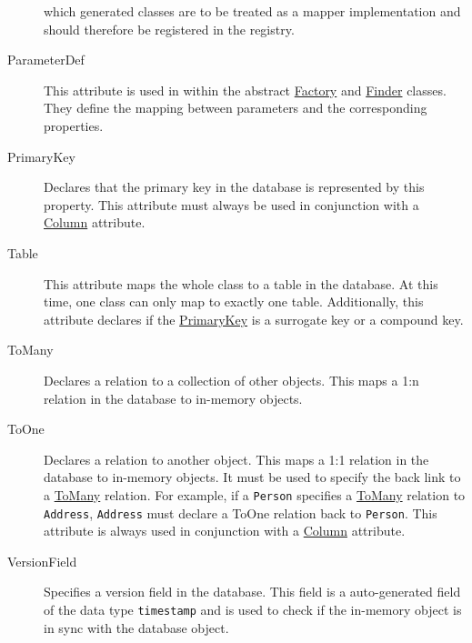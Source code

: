 \begin{description}
				which generated classes are to be treated as a mapper implementation and 
				should therefore be registered in the registry.
			\item[ParameterDef]
				This attribute is used in within the abstract \hyperlink{FactoryAttribute}{Factory} and
				\hyperlink{FinderAttribute}{Finder} classes. They define the mapping between
				parameters and the corresponding properties.
			\item[PrimaryKey]
			\hypertarget{PrimaryKeyAttribute}{}
				Declares that the primary key in the database is represented by this property. This attribute
				must always be used in conjunction with a \hyperlink{ColumnAttribute}{Column} attribute.
			\item[Table]
			\hypertarget{TableAttribute}{}
				This attribute maps the whole class to a table in the database. At this time, one class
				can only map to exactly one table. Additionally, this attribute declares if the
				\hyperlink{PrimaryKeyAttribute}{PrimaryKey} is a surrogate key or a compound key.
			\item[ToMany]
			\hypertarget{ToManyAttribute}{}
				Declares a relation to a collection of other objects. This maps a 1:n relation in the
				database to in-memory objects.
			\item[ToOne]
			\hypertarget{ToOneAttribute}{}
				Declares a relation to another object. This maps a 1:1 relation in the database to in-memory
				objects. It must be used to specify the back link to a \hyperlink{ToManyAttribute}{ToMany} relation.
				For example, if a \verb~Person~ specifies a \hyperlink{ToManyAttribute}{ToMany} relation to
				\verb~Address~, \verb~Address~ must declare a ToOne relation back to \verb~Person~.
				This attribute is always used in conjunction with a \hyperlink{ColumnAttribute}{Column} attribute.
			\item[VersionField]
				Specifies a version field in the database. This field is a auto-generated field of the data type
				\verb~timestamp~ and is used to check if the in-memory object is in sync with the database object.
		\end{description}
		